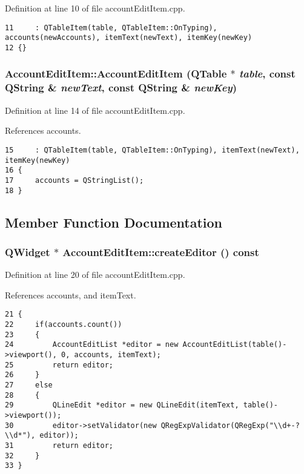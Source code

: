 Definition at line 10 of file account\-Edit\-Item.cpp.

\footnotesize\begin{verbatim}11     : QTableItem(table, QTableItem::OnTyping), accounts(newAccounts), itemText(newText), itemKey(newKey)
12 {}
\end{verbatim}\normalsize 


\hypertarget{classAccountEditItem_a1}{
\subsubsection[AccountEditItem]{\setlength{\rightskip}{0pt plus 5cm}Account\-Edit\-Item::Account\-Edit\-Item (QTable $\ast$ {\em table}, const QString \& {\em new\-Text}, const QString \& {\em new\-Key})}}
\label{classAccountEditItem_a1}


Definition at line 14 of file account\-Edit\-Item.cpp.

References accounts.

\footnotesize\begin{verbatim}15     : QTableItem(table, QTableItem::OnTyping), itemText(newText), itemKey(newKey)
16 {
17     accounts = QStringList();
18 }
\end{verbatim}\normalsize 




\subsection{Member Function Documentation}
\hypertarget{classAccountEditItem_a2}{
\subsubsection[createEditor]{\setlength{\rightskip}{0pt plus 5cm}QWidget $\ast$ Account\-Edit\-Item::create\-Editor () const}}
\label{classAccountEditItem_a2}


Definition at line 20 of file account\-Edit\-Item.cpp.

References accounts, and item\-Text.

\footnotesize\begin{verbatim}21 {
22     if(accounts.count())
23     {
24         AccountEditList *editor = new AccountEditList(table()->viewport(), 0, accounts, itemText);
25         return editor;
26     }
27     else
28     {
29         QLineEdit *editor = new QLineEdit(itemText, table()->viewport());
30         editor->setValidator(new QRegExpValidator(QRegExp("\\d+-?\\d*"), editor));
31         return editor;
32     }
33 }
\end{verbatim}\normalsize 


